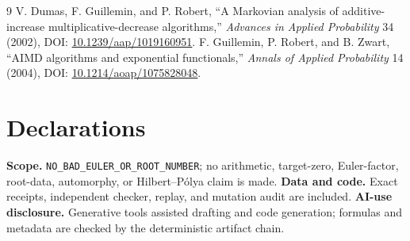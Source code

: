 \documentclass[10pt]{article}
\begin{document}
\begin{thebibliography}{9}
 V. Dumas, F. Guillemin, and P. Robert, ``A Markovian
analysis of additive-increase multiplicative-decrease algorithms,''
\emph{Advances in Applied Probability} 34 (2002), DOI:
\href{https://doi.org/10.1239/aap/1019160951}{10.1239/aap/1019160951}.
 F. Guillemin, P. Robert, and B. Zwart, ``AIMD
algorithms and exponential functionals,'' \emph{Annals of Applied Probability}
14 (2004), DOI:
\href{https://doi.org/10.1214/aoap/1075828048}{10.1214/aoap/1075828048}.
\end{thebibliography}

\section*{Declarations}
\textbf{Scope.} \texttt{NO\_BAD\_EULER\_OR\_ROOT\_NUMBER}; no arithmetic,
target-zero, Euler-factor, root-data, automorphy, or Hilbert--Pólya claim is
made.  \textbf{Data and code.} Exact receipts, independent checker, replay,
and mutation audit are included.  \textbf{AI-use disclosure.} Generative
tools assisted drafting and code generation; formulas and metadata are checked
by the deterministic artifact chain.
\end{document}
